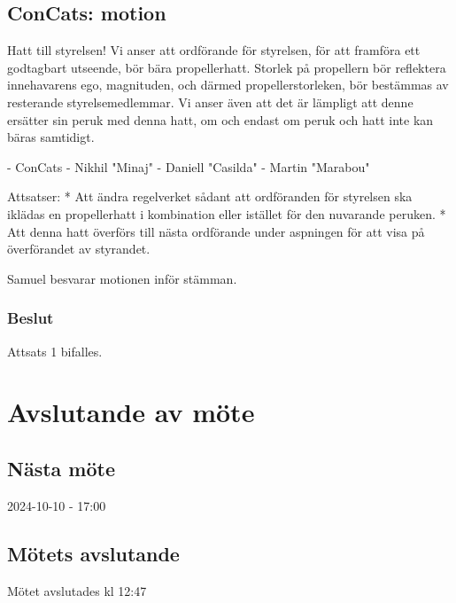 \documentclass[protokoll]{dvd}
\begin{document}
\subsection{ConCats: motion}

Hatt till styrelsen!
Vi anser att ordförande för styrelsen, för att framföra ett godtagbart utseende, bör bära propellerhatt. Storlek på propellern bör reflektera innehavarens ego, magnituden, och därmed propellerstorleken, bör bestämmas av resterande styrelsemedlemmar. Vi anser även att det är lämpligt att denne ersätter sin peruk med denna hatt, om och endast om peruk och hatt inte kan bäras samtidigt. 

- ConCats
- Nikhil "Minaj"
- Daniell "Casilda"
- Martin "Marabou"

Attsatser:
    * Att ändra regelverket sådant att ordföranden för styrelsen ska iklädas en propellerhatt i kombination eller istället för den nuvarande peruken.
    * Att denna hatt överförs till nästa ordförande under aspningen för att visa på överförandet av styrandet.


\begin{attsatser}
    \item Samuel besvarar motionen inför stämman.
\end{attsatser}
\subsubsection{Beslut} 
\begin{attsatser}     
\item Attsats 1 bifalles. 
\end{attsatser}

\newpage
\section{Avslutande av möte}

\subsection{Nästa möte}
2024-10-10 - 17:00

\subsection{Mötets avslutande}
Mötet avslutades kl 12:47 

\styrelsesignaturer
\end{document}
